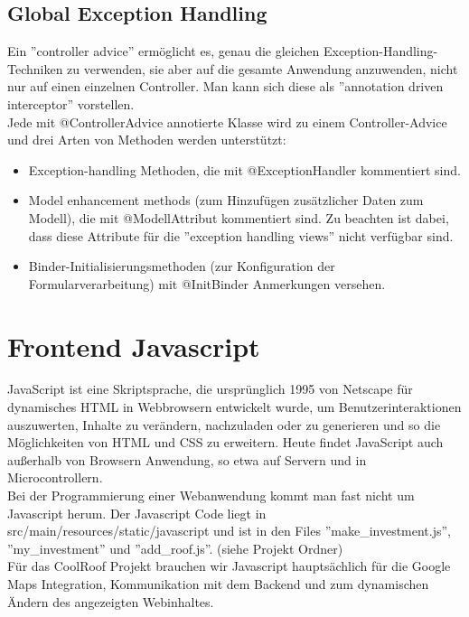 \documentclass[12pt,a4paper]{article}
\begin{document}
\subsection{Global Exception Handling}
Ein ''controller advice'' ermöglicht es, genau die gleichen Exception-Handling-Techniken zu verwenden, sie aber auf die gesamte Anwendung anzuwenden, nicht nur auf einen einzelnen Controller. Man kann sich diese als ''annotation driven interceptor'' vorstellen.\\
Jede mit @ControllerAdvice annotierte Klasse wird zu einem Controller-Advice und drei Arten von Methoden werden unterstützt:
\begin{itemize}
	\item[\textbullet] Exception-handling Methoden, die mit @ExceptionHandler kommentiert sind.
	\item[\textbullet] Model enhancement methods (zum Hinzufügen zusätzlicher Daten zum Modell), die mit @ModellAttribut kommentiert sind. Zu beachten ist dabei, dass diese Attribute für die ''exception handling views'' nicht verfügbar sind.
	\item[\textbullet] Binder-Initialisierungsmethoden (zur Konfiguration der Formularverarbeitung) mit  @InitBinder Anmerkungen versehen.
\end{itemize}



\section{Frontend Javascript}
JavaScript ist eine Skriptsprache, die ursprünglich 1995 von Netscape für dynamisches HTML in Webbrowsern entwickelt wurde, um Benutzerinteraktionen auszuwerten, Inhalte zu verändern, nachzuladen oder zu generieren und so die Möglichkeiten von HTML und CSS zu erweitern. Heute findet JavaScript auch außerhalb von Browsern Anwendung, so etwa auf Servern und in Microcontrollern.\\

Bei der Programmierung einer Webanwendung kommt man fast nicht um Javascript herum.
Der Javascript Code liegt in src/main/resources/static/javascript und ist in den Files ''make\_investment.js'', ''my\_investment'' und ''add\_roof.js''. (siehe Projekt Ordner)\\


Für das CoolRoof Projekt brauchen wir Javascript hauptsächlich für die Google Maps Integration, Kommunikation mit dem Backend und zum dynamischen Ändern des angezeigten Webinhaltes. \\
\end{document}
